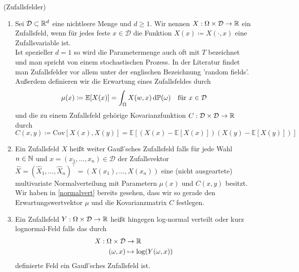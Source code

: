 \begin{Definition}(Zufallsfelder) 
	\label{randomFields}
	\begin{enumerate}[label=(\alph*)]
		\item Sei $ \mathcal{D} \subset \mathbb{R}^d  $ eine nichtleere Menge und $ d \geq 1$. Wir nennen $ X : \Omega \times \mathcal{D} \to \mathbb{R}$ ein Zufallsfeld, wenn für jedes feste $ x \in \mathcal{D} $ die Funktion $ X(x) \coloneqq X(\cdot,x) $ eine Zufallsvariable ist. \\
		Ist spezieller $ d=1 $ so wird die Parametermenge auch oft mit $ T $ bezeichnet und man spricht von einem stochastischen Prozess.
		In der Literatur findet man Zufallsfelder vor allem unter der englischen Bezeichnung 'random fields'. \\
		Außerdem definieren wir die Erwartung eines Zufallsfeldes durch
		\[
			\mu(x) \coloneqq \mathbb{E}[X(x)] = \int_{\Omega} X(w,x) \, \mathrm{d} \mathbb{P}(\omega)  \quad \text{für } x \in \mathcal{D}
		\]
		und die zu einem Zufallsfeld gehörige Kovarianzfunktion $ C: \mathcal{D} \times \mathcal{D} \to \mathbb{R} $ durch 
		\[
			C(x,y) \coloneqq \text{Cov}[X(x),X(y)] = \mathbb{E}\left[ \left(X(x)-\mathbb{E}[X(x)] \right) \left(X(y)-\mathbb{E}[X(y)]\right) \right]
		\]
		\item Ein Zufallsfeld $ X $ heißt weiter Gauß'sches Zufallsfeld falls für jede Wahl $ n \in \mathbb{N} $ und $ x = (x_1,\dots,x_n) \in \mathcal{D}$
		der Zufallsvektor $ \hat{X} = (\hat{X}_1,\dots,\hat{X}_n)^{\top} = (X(x_1),\dots,X(x_n)) $ eine (nicht ausgeartete) multivariate Normalverteilung mit Parametern $ \mu(x) $ und $ C(x,y) $ besitzt.
		Wir haben in \ref{normalvert} bereits gesehen, dass wir so gerade den Erwartungswertvektor $ \mu $ und die Kovarianzmatrix $ C $ festlegen.
		\item Ein Zufallsfeld $ Y: \Omega \times \mathcal{D} \to \mathbb{R} $ heißt hingegen log-normal verteilt oder kurz lognormal-Feld
		falls das durch 
		\begin{align*}
			X: \Omega \times \mathcal{D} &\to \mathbb{R}  \\ (\omega,x) &\mapsto \log(Y(\omega,x)) 
		\end{align*}
		 definierte Feld ein Gauß'sches Zufallsfeld ist.
		
	\end{enumerate}
\end{Definition}



